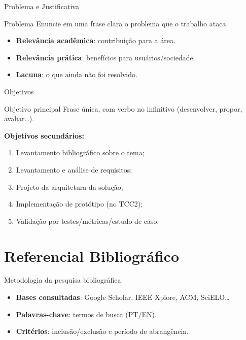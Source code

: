 \documentclass[
    aspectratio=169,   %
    12pt,
    brazil
]{beamer}
\begin{document}
\begin{frame}{Problema e Justificativa}
  \begin{block}{Problema}
    Enuncie em uma frase clara o problema que o trabalho ataca.
  \end{block}
  \begin{itemize}
    \item \textbf{Relevância acadêmica}: contribuição para a área.
    \item \textbf{Relevância prática}: benefícios para usuários/sociedade.
    \item \textbf{Lacuna}: o que ainda não foi resolvido.
  \end{itemize}
\end{frame}

\begin{frame}{Objetivos}
  \begin{block}{Objetivo principal}
    Frase única, com verbo no infinitivo (desenvolver, propor, avaliar\ldots).
  \end{block}
  \textbf{Objetivos secundários:}
  \begin{enumerate}
    \item Levantamento bibliográfico sobre o tema;
    \item Levantamento e análise de requisitos;
    \item Projeto da arquitetura da solução;
    \item Implementação de protótipo (no TCC2);
    \item Validação por testes/métricas/estudo de caso.
  \end{enumerate}
\end{frame}

\section{Referencial Bibliográfico}
\begin{frame}{Metodologia da pesquisa bibliográfica}
  \begin{itemize}
    \item \textbf{Bases consultadas}: Google Scholar, IEEE Xplore, ACM, SciELO\ldots
    \item \textbf{Palavras-chave}: termos de busca (PT/EN).
    \item \textbf{Critérios}: inclusão/exclusão e período de abrangência.
  \end{itemize}
\end{frame}
\end{document}
